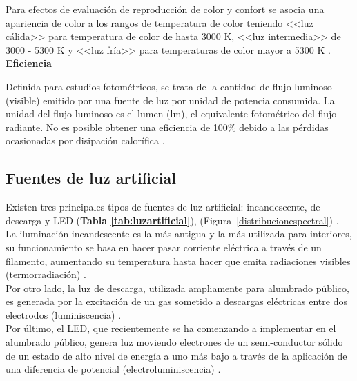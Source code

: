 Para efectos de evaluación de reproducción de color y confort se asocia una apariencia de color a los rangos de temperatura de color teniendo <<luz cálida>> para temperatura de color de hasta 3000 K, <<luz intermedia>> de 3000 - 5300 K y <<luz fría>> para temperaturas de color mayor a 5300 K \citep{Globaldiscussion}.\\


\textbf{Eficiencia}

Definida para estudios fotométricos, se trata de la cantidad de flujo luminoso (visible) emitido por una fuente de luz por unidad de potencia consumida. La unidad del flujo luminoso es el lumen (lm), el equivalente fotométrico del flujo radiante. No es posible obtener una eficiencia de 100$\%$ debido a las pérdidas ocasionadas por disipación calorífica \citep{LibroCL}.


\subsection{Fuentes de luz artificial}
\label{subsec:fuentesdeluz}

Existen tres principales tipos de fuentes de luz artificial: incandescente, de descarga y LED (\textbf{Tabla \ref{tab:luzartificial}}), (Figura~\ref{distribucionespectral})  \citep{Solano2013b, Eldvidge2010,LibroCL}.\\

La iluminación incandescente es la más antigua y la más utilizada para interiores, su funcionamiento se basa en hacer pasar corriente eléctrica a través de un filamento, aumentando su temperatura hasta hacer que emita radiaciones visibles (termorradiación) \citep{LibroCL}.\\

Por otro lado, la luz de descarga, utilizada ampliamente para alumbrado público, es generada por la excitación de un gas sometido a descargas eléctricas entre dos electrodos (luminiscencia) \citep{LibroCL,Solano2013b}.\\

Por último, el LED, que recientemente se ha comenzando a implementar en el alumbrado público, genera luz moviendo electrones de un semi-conductor sólido de un estado de alto nivel de energía a uno más bajo a través de la aplicación de una diferencia de potencial (electroluminiscencia) \citep{LibroCL,Solano2013b}.


